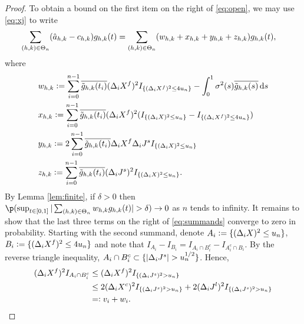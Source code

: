 \begin{proof}
     To obtain a bound on the first item on the right of \eqref{eq:open}, we may use \eqref{eq:xj} to write
    \begin{align}
      \sumt &(\ceen{X} - \cee)\ghk(t)   = \sumt (w_{h,k} + x_{h,k} + y_{h,k} + z_{h,k}) \ghk(t),\label{eq:summands} 
    \end{align}
    where 
    \begin{align}
      &w_{h,k} :=  \sumin \btghki  (\dxf)^2 \indxff - \int^{1}_{0} \sigma^2(s) \btghks \D s \notag\\
      &x_{h,k} :=  \sumin \btghki(\dxf)^2 (\indx - \indxff) \notag\\
      &y_{h,k}  := 2 \sumin \btghki\dxf \djt \indx \notag \\
      &z_{h,k} := \sumin \btghki(\djt)^2\indx.
      \label{}
    \end{align}
    By Lemma \eqref{lem:finite}, if $\delta > 0$ then %
      $\p(\sup_{t \in [0,1]}\vert \sumt w_{h,k} \ghk(t) \vert > \delta) \to 0$ %
    as $n$ tends to infinity.  It remains to show that the last three terms on the right of \eqref{eq:summands} converge to zero in probability. Starting with the second summand, denote $A_i := \{(\dx)^2 \le u_n\}$,  $B_i   := \{(\dxf)^2 \le 4 u_n\}$ and note that $I_{A_i} - I_{B_i} = I_{A_i \cap B_i^c} - I_{A^c_i\cap B_i}$. By the reverse triangle inequality,   $A_i \cap B_i^c \subset \{\vert \djt \vert > u_n^{1/2}\}$. Hence, 
    \begin{align}
      (\dxf)^2 I_{A_i \cap B_i^c} &\le (\dxf)^2 I_{\{(\djt)^2 > u_n\}}\\
       & \le 2 (\dxc)^2 I_{\{(\djt)^2 > u_n\}}
       + 2 (\djl)^2 I_{\{(\djt)^2 > u_n\}}\notag\\
       & =: v_i + w_i. 
      \label{eq:longineq}
    \end{align}
    \begin{comment}
    where \begin{align} &v_n :=  2c H_n \Lambda n^{-1} \log(n) \sumin I_{\{(\djt)^2 > u_n\}} \notag \\ & w_n: = c H_n \sumin  (\djl)^2 I_{\{(\djt)^2 > u_n\}}\notag \end{align}  where $c$ is a sufficiently large constant, and $\Lambda$ is a finite-valued random variable satisfying  $\Lambda \ge  \sup_{t \in \domain} \vert b(t)\vert  + C $, where $C^{1/2}$ is the finite-valued random variable from Lemma \ref{lem:mylevy}.  Let  $\delta > 0$ be given, put  $x_n(t)  :=  \sumt\left(\sumin  \btghki(\dxf)^2 I_{A_i \cap B_i^c})\right)\ghk(t)$  and note that 

\end{comment}
\end{proof}
